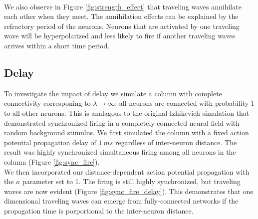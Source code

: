 \documentclass[a4paper,11pt]{article}
\begin{document}
\\
We also observe in Figure \ref{fig:strength_effect} that traveling waves annihilate each other when they meet.
The annihilation effects can be explained by the refractory period of the neurons.
Neurons that are activated by one traveling wave will be hyperpolarized and less likely to fire if another traveling waves arrives within a short time period.

\subsection{Delay}
To investigate the impact of delay we simulate a column with complete connectivity corresponing to $\lambda \rightarrow \infty$: all neurons are connected with probability 1 to all other neurons.
This is analagous to the original Izhikevich simulation \cite{izzy_code} that demonstrated synchronized firing in a completely connected neural field with random background stimulus.
We first simulated the column with a fixed action potential propagation delay of $1~ms$ regardless of inter-neuron distance.
The result was highly synchronized simultaneous firing among all neurons in the column (Figure \ref{fig:sync_fire}). \\ 
We then incorporated our distance-dependent action potential propagation with the $\kappa$ parameter set to 1.
The firing is still highly synchronized, but traveling waves are now evident (Figure \ref{fig:sync_fire_delay}).
This demonstrates that one dimensional traveling waves can emerge from fully-connected networks if the propagation time is porportional to the inter-neuron distance.
\end{document}
